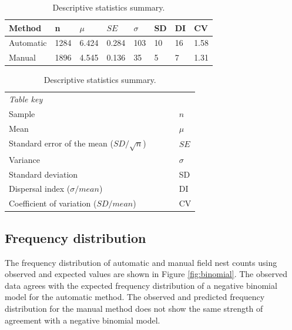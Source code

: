 \begin{table}[!htbp] \myfloatalign \caption[Descriptive statistics summary.]{Descriptive statistics summary.}\label{tab:descriptive-statistics-summary} 
\begin{tabular}{p{0.6in}p{0.4in}p{0.4in}p{0.4in}p{0.4in}p{0.4in}p{0.4in}p{0.4in}} \toprule
Method & n	& $ \mu $& $ SE $ & $\sigma $	& SD & DI & CV \\ \midrule
Automatic & 	1284 & 	6.424 & 	0.284 & 	103 & 	10 & 	16 & 	1.58 \\
Manual &	1896 & 	4.545 & 	0.136 & 	35 & 	5 & 	7 & 	1.31 \\ 
 \bottomrule
\end{tabular} 
\begin{tabular}{p{3.4in}llll} \\
\emph{Table key }& & & & \\
Sample & & & &  $ n $\\
Mean & & & &  $ \mu $\\
Standard error of the mean ($ SD/\sqrt{n} $) & & & & $SE$ \\
Variance & & & &  $\sigma $ \\
Standard deviation & & & &  SD \\
Dispersal index ($ \sigma/mean $) & & & &  DI \\
Coefficient of variation ($ SD/mean $) & & & & CV \\ 
\end{tabular}
\end{table}

\subsection{Frequency distribution}\label{sec:frequency-distribution}
The frequency distribution of automatic and manual field nest counts using observed and expected values are shown in Figure \ref{fig:binomial}. The observed data agrees with the expected frequency distribution of a negative binomial model for the automatic method. The observed and predicted frequency distribution for the manual method does not show the same strength of agreement with a negative binomial model. 

